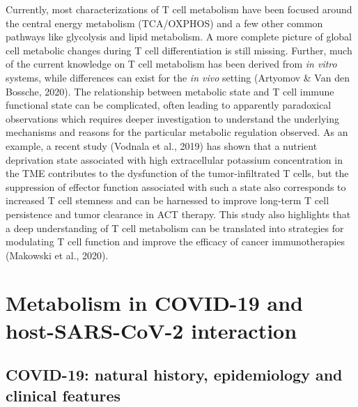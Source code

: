 \documentclass[12pt,twoside,openany,\mydriver]{thesis}  %
\begin{document}
Currently, most characterizations of T cell metabolism have been focused around the central energy metabolism (TCA/OXPHOS) and a few other common pathways like glycolysis and lipid metabolism. A more complete picture of global cell metabolic changes during T cell differentiation is still missing. Further, much of the current knowledge on T cell metabolism has been derived from \emph{in vitro} systems, while differences can exist for the \emph{in vivo} setting (Artyomov \& Van den Bossche, 2020). The relationship between metabolic state and T cell immune functional state can be complicated, often leading to apparently paradoxical observations which requires deeper investigation to understand the underlying mechanisms and reasons for the particular metabolic regulation observed. As an example, a recent study (Vodnala et al., 2019) has shown that a nutrient deprivation state associated with high extracellular potassium concentration in the TME contributes to the dysfunction of the tumor-infiltrated T cells, but the suppression of effector function associated with such a state also corresponds to increased T cell stemness and can be harnessed to improve long-term T cell persistence and tumor clearance in ACT therapy. This study also highlights that a deep understanding of T cell metabolism can be translated into strategies for modulating T cell function and improve the efficacy of cancer immunotherapies (Makowski et al., 2020).

\hypertarget{metabolism-in-covid-19-and-host-sars-cov-2-interaction}{%
\section{Metabolism in COVID-19 and host-SARS-CoV-2 interaction}\label{metabolism-in-covid-19-and-host-sars-cov-2-interaction}}

\hypertarget{covid-19-natural-history-epidemiology-and-clinical-features}{%
\subsection{COVID-19: natural history, epidemiology and clinical features}\label{covid-19-natural-history-epidemiology-and-clinical-features}}
\end{document}
